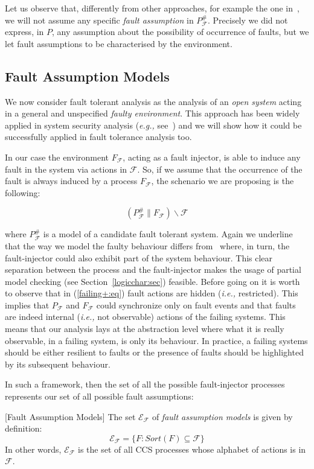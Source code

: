 \documentclass{entcs}
\newcommand{\eg}{\emph{e.g., }}
\newcommand{\ie}{\emph{i.e., }}
\newcommand{\Faults}{\mathcal{F}}
\newcommand{\faulttolerant}[1]{{#1}^{\#}_\Faults}
\newcommand{\env}[1]{\mathcal{E}_{#1}}
\newcommand{\faultenv}{\env{\Faults}}
\newcommand{\faultscenarios}{\faultenv}
\newcommand{\res}{\backslash}
\begin{document}
Let us observe that, differently from other approaches, for example
the one in~\cite{BFG02:stvr}, we will not assume any specific
\emph{fault assumption} in $\faulttolerant{P}$.  Precisely we did not
express, in $P$, any assumption about the possibility of occurrence of
faults, but we let fault assumptions to be characterised by the
environment.

\subsection{Fault Assumption Models}

We now consider fault tolerant analysis as the analysis of an \emph{open
  system} acting in a general and unspecified \emph{faulty environment}. This
approach has been widely applied in system security analysis (\eg
see~\cite{M98:csfw,fabiosos}) and we will show how it could be successfully
applied in fault tolerance analysis too.

In our case the environment $F_\Faults$, acting as a fault injector, is able
to induce any fault in the system via actions in $\Faults$. So, if
we assume that the occurrence of the fault is always induced by a process
$F_\Faults$, the schenario we are proposing is the following:%

\begin{equation}
\label{failing+:eq}
(\faulttolerant{P} \parallel F_\Faults) \res \Faults
\end{equation}%

where $\faulttolerant{P}$ is a model of a candidate fault tolerant
system.  Again we underline that the way we model the faulty behaviour
differs from~\cite{BFG02:stvr} where, in turn, the fault-injector
could also exhibit part of the system behaviour. This clear separation
between the process and the fault-injector makes the usage of partial
model checking (see Section~\ref{logicchar:sec}) feasible.  Before
going on it is worth to observe that in (\ref{failing+:eq}) fault
actions are hidden (\ie restricted). This implies that $P_\Faults$ and
$F_\Faults$ could synchronize only on fault events and that faults are
indeed internal (\ie not observable) actions of the failing
systems. This means that our analysis lays at the abstraction level
where what it is really observable, in a failing system, is only its
behaviour. In practice, a failing systems should be either resilient
to faults or the presence of faults should be highlighted by its
subsequent behaviour.

In such a framework, then the set of all the possible fault-injector processes
represents our set of all possible fault assumptions:
%
\begin{definition}
\label{fault-ass:def}[Fault Assumption Models]
The set $\faultscenarios$ of \emph{fault assumption models} is given by
definition:
$$
\faultscenarios = \{ F: \mathit{Sort}(F) \subseteq \Faults \}
$$ In other words, $\faultscenarios$ is the set of all CCS processes
whose alphabet of actions is in $\Faults$.
\end{definition}%
\end{document}
